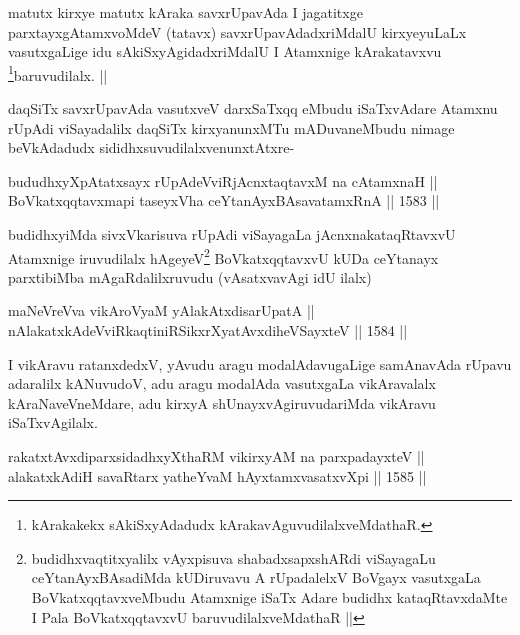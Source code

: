 \begin{artha}
matutx kirxye matutx kAraka savxrUpavAda I jagatitxge parxtayxgAtamxvoMdeV (tatavx) savxrUpavAdadxriMdalU kirxyeyuLaLx vasutxgaLige idu sAkiSxyAgidadxriMdalU I Atamxnige kArakatavxvu \footnote{kArakakekx sAkiSxyAdadudx kArakavAguvudilalxveMdathaR.}baruvudilalx. ||
\end{artha}

\begin{artha}
daqSiTx savxrUpavAda vasutxveV darxSaTxqq eMbudu iSaTxvAdare Atamxnu rUpAdi viSayadalilx daqSiTx kirxyanunxMTu mADuvaneMbudu nimage beVkAdadudx sididhxsuvudilalxvenunxtAtxre-
\end{artha}

\begin{shl}
bududhxyXpAtatxsayx rUpAdeVviRjAcnxtaqtavxM na cA\s \s tamxnaH || \\
BoVkatxqqtavxmapi taseyxVha ceYtanAyxBAsavatamxRnA \hfill || 1583 ||  
\end{shl}

\begin{artha}
budidhxyiMda sivxVkarisuva rUpAdi viSayagaLa jAcnxnakataqRtavxvU Atamxnige iruvudilalx hAgeyeV\footnote{budidhxvaqtitxyalilx vAyxpisuva shabadxsapxshARdi viSayagaLu ceYtanAyxBAsadiMda kUDiruvavu A rUpadalelxV BoVgayx vasutxgaLa BoVkatxqqtavxveMbudu Atamxnige iSaTx Adare budidhx kataqRtavxdaMte I Pala BoVkatxqqtavxvU baruvudilalxveMdathaR ||} BoVkatxqqtavxvU kUDa ceYtanayx parxtibiMba mAgaRdalilxruvudu (vAsatxvavAgi idU ilalx)
\end{artha}


\begin{shl}
maNeVreVva vikAroV\s yaM yA\s lakAtxdisarUpatA || \\
nAlakatxkAdeVviRkaqtiniRSikxrXyatAvxdiheVSayxteV \hfill || 1584 ||  
\end{shl}

\begin{artha}
I vikAravu ratanxdedxV, yAvudu aragu modalAdavugaLige samAnavAda rUpavu adaralilx kANuvudoV, adu aragu modalAda vasutxgaLa vikAravalalx kAraNaveVneMdare, adu kirxyA shUnayxvAgiruvudariMda vikAravu iSaTxvAgilalx.
\end{artha}


\begin{shl}
rakatxtAvxdiparxsidadhxyXthaRM vikirxyAM na parxpadayxteV || \\
alakatxkAdiH savaRtarx yatheYvaM hAyxtamxvasatxvXpi \hfill || 1585 ||  
\end{shl}

